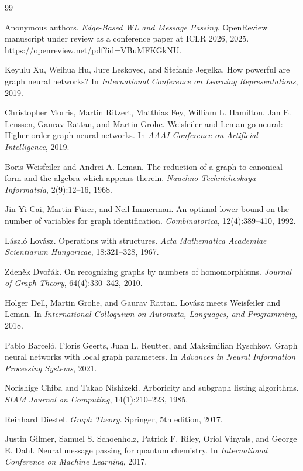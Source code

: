 \documentclass[11pt]{article}
\begin{document}
\begin{thebibliography}{99}

Anonymous authors.
\newblock \emph{Edge-Based WL and Message Passing}.
\newblock OpenReview manuscript under review as a conference paper at ICLR 2026, 2025.
\newblock \url{https://openreview.net/pdf?id=VBuMFKGkNU}.

Keyulu Xu, Weihua Hu, Jure Leskovec, and Stefanie Jegelka.
\newblock How powerful are graph neural networks?
\newblock In \emph{International Conference on Learning Representations}, 2019.

Christopher Morris, Martin Ritzert, Matthias Fey, William L. Hamilton, Jan E. Lenssen, Gaurav Rattan, and Martin Grohe.
\newblock Weisfeiler and Leman go neural: Higher-order graph neural networks.
\newblock In \emph{AAAI Conference on Artificial Intelligence}, 2019.

Boris Weisfeiler and Andrei A. Leman.
\newblock The reduction of a graph to canonical form and the algebra which appears therein.
\newblock \emph{Nauchno-Technicheskaya Informatsia}, 2(9):12--16, 1968.

Jin-Yi Cai, Martin F\"urer, and Neil Immerman.
\newblock An optimal lower bound on the number of variables for graph identification.
\newblock \emph{Combinatorica}, 12(4):389--410, 1992.

L\'aszl\'o Lov\'asz.
\newblock Operations with structures.
\newblock \emph{Acta Mathematica Academiae Scientiarum Hungaricae}, 18:321--328, 1967.

Zden\v{e}k Dvo\v{r}\'ak.
\newblock On recognizing graphs by numbers of homomorphisms.
\newblock \emph{Journal of Graph Theory}, 64(4):330--342, 2010.

Holger Dell, Martin Grohe, and Gaurav Rattan.
\newblock Lov\'asz meets Weisfeiler and Leman.
\newblock In \emph{International Colloquium on Automata, Languages, and Programming}, 2018.

Pablo Barcel\'o, Floris Geerts, Juan L. Reutter, and Maksimilian Ryschkov.
\newblock Graph neural networks with local graph parameters.
\newblock In \emph{Advances in Neural Information Processing Systems}, 2021.

Norishige Chiba and Takao Nishizeki.
\newblock Arboricity and subgraph listing algorithms.
\newblock \emph{SIAM Journal on Computing}, 14(1):210--223, 1985.

Reinhard Diestel.
\newblock \emph{Graph Theory}.
\newblock Springer, 5th edition, 2017.

Justin Gilmer, Samuel S. Schoenholz, Patrick F. Riley, Oriol Vinyals, and George E. Dahl.
\newblock Neural message passing for quantum chemistry.
\newblock In \emph{International Conference on Machine Learning}, 2017.

\end{thebibliography}
\end{document}
